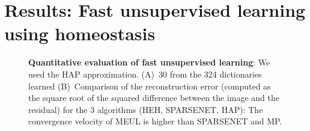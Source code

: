 \documentclass[a4paper, 11pt, draft]{article} %
\begin{document}



\section{Results: Fast unsupervised learning using homeostasis}\label{results}
\begin{figure}[!ht]%
\caption{
{\bf Quantitative evaluation of fast unsupervised learning}: We used the HAP approximation. %
 {\sf (A)}~30 from the 324 dictionaries learned {\sf (B)}~Comparison of the reconstruction error (computed as the square root of the squared difference between the image and the residual) for the 3 algorithms (HEH, SPARSENET, HAP): The convergence velocity of MEUL is higher than SPARSENET and MP.
\label{fig:HAP}}%
\end{figure}%
\end{document}
